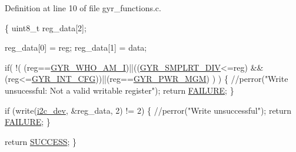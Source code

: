 Definition at line 10 of file gyr\-\_\-functions.\-c.


\begin{DoxyCode}
\{
  uint8\_t reg\_data[2];

  reg\_data[0] = reg;
  reg\_data[1] = data;

  \textcolor{keywordflow}{if}( !( (reg==\hyperlink{communication_2imu__regs_8h_ab2499ff4167376accdbdec09f5e1b021}{GYR\_WHO\_AM\_I})||((\hyperlink{communication_2imu__regs_8h_a04a18568e6e39825c98be5ec2976bec4}{GYR\_SMPLRT\_DIV}<=reg)
      &&(reg<=\hyperlink{communication_2imu__regs_8h_ad0b8386ab023e17beb305025abf96e18}{GYR\_INT\_CFG}))||(reg==\hyperlink{communication_2imu__regs_8h_a5eba4af610a1ec85320e940bf44855eb}{GYR\_PWR\_MGM}) ) )
  \{
      \textcolor{comment}{//perror("Write unsucessful: Not a valid writable register");}
      \textcolor{keywordflow}{return} \hyperlink{calibration_2calibration_8h_a6d58f9ac447476b4e084d7ca383f5183}{FAILURE};
  \}
        
  \textcolor{keywordflow}{if} (write(\hyperlink{CommunicationV0_2communication_8c_a7751bd45ac1064efb35adf1f19c25db8}{i2c\_dev}, &reg\_data, 2) != 2) \{                
          \textcolor{comment}{//perror("Write unsuccessful");}
          \textcolor{keywordflow}{return} \hyperlink{calibration_2calibration_8h_a6d58f9ac447476b4e084d7ca383f5183}{FAILURE};
  \}

  \textcolor{keywordflow}{return} \hyperlink{calibration_2calibration_8h_aa90cac659d18e8ef6294c7ae337f6b58}{SUCCESS};
\}
\end{DoxyCode}
